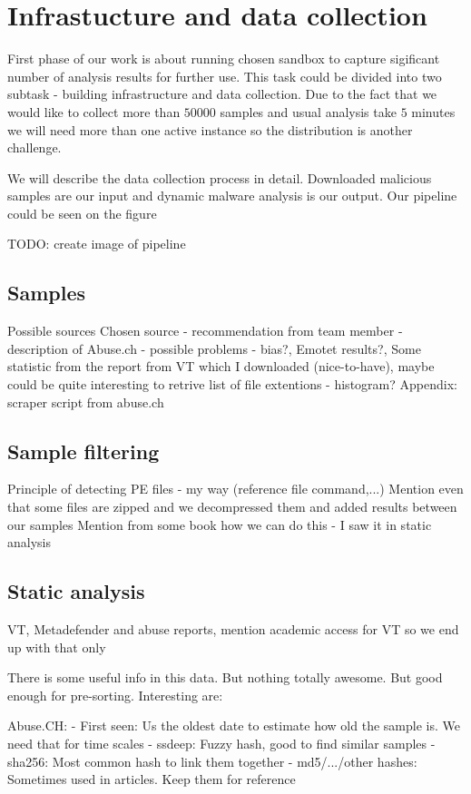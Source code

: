 \chapter{Infrastucture and data collection} \label{chap:infrastructure}
First phase of our work is about running chosen sandbox to capture sigificant number of analysis results for further use. This task could be divided into two subtask - building infrastructure and data collection. Due to the fact that we would like to collect more than $50 000$ samples and usual analysis take $5$ minutes we will need more than one active instance so the distribution is another challenge.

We will describe the data collection process in detail. Downloaded malicious samples are our input and dynamic malware analysis is our output. Our pipeline could be seen on the figure 

TODO: create image of pipeline 

\section{Samples}
Possible sources
Chosen source
- recommendation from team member
- description of Abuse.ch
- possible problems - bias?, Emotet results?, Some statistic from the report from VT which I downloaded (nice-to-have), maybe could be quite interesting to retrive list of file extentions - histogram?
Appendix: scraper script from abuse.ch
\section{Sample filtering}
Principle of detecting PE files - my way (reference file command,...)
Mention even that some files are zipped and we decompressed them and added results between our samples
Mention from some book how we can do this - I saw it in static analysis

\section{Static analysis}
VT, Metadefender and abuse reports, mention academic access for VT so we end up with that only

There is some useful info in this data. But nothing totally awesome. But good enough for pre-sorting.
Interesting are:

Abuse.CH:
- First seen: Us the oldest date to estimate how old the sample is. We need that for time scales
- ssdeep: Fuzzy hash, good to find similar samples
- sha256: Most common hash to link them together
- md5/.../other hashes: Sometimes used in articles. Keep them for reference

